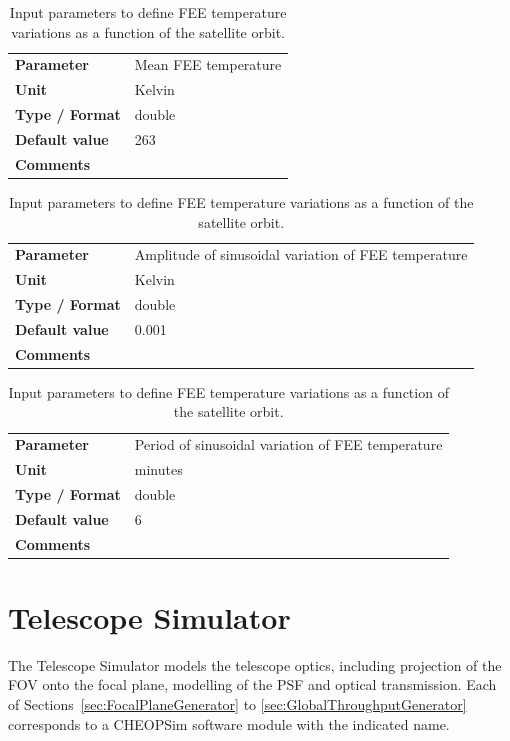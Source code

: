 \documentclass[11pt]{article}      %
\def\HCode#1{}
\def\htmlanchor#1{\HCode{<a id="#1"></a>}}
\begin{document}
\begin{table}[hb]
  \caption{Input parameters to define FEE temperature variations as a function of the satellite orbit.}

  \htmlanchor{feeMeanTemperature}
  \begin{tabular}{| l | p{13cm} |}
    \hline 
    {\bf Parameter} & Mean FEE temperature\\
    {\bf Unit} & Kelvin\\
    {\bf Type / Format} & double\\
    {\bf Default value} & 263\\
    {\bf Comments} & \\
    \hline
  \end{tabular}
  \bigskip

  \htmlanchor{feeTemperatureAmplitude}
  \begin{tabular}{| l | p{13cm} |}
    \hline 
    {\bf Parameter} & Amplitude of sinusoidal variation of FEE temperature\\
    {\bf Unit} & Kelvin\\
    {\bf Type / Format} & double\\
    {\bf Default value} & 0.001\\
    {\bf Comments} & \\
    \hline
  \end{tabular}
  \bigskip 

  \htmlanchor{feeTemperaturePeriod}
  \begin{tabular}{| l | p{13cm} |}
    \hline 
    {\bf Parameter} & Period of sinusoidal variation of FEE temperature\\
    {\bf Unit} & minutes\\
    {\bf Type / Format} & double\\
    {\bf Default value} & 6\\
    {\bf Comments} & \\
    \hline
  \end{tabular}
  \bigskip

  \label{tab:orbit4}
\end{table}

\clearpage
\section{Telescope Simulator}
\label{sec:Telescope}

The Telescope Simulator models the telescope optics, including projection of the FOV onto the focal plane, modelling of the PSF and
optical transmission. Each of Sections~\ref{sec:FocalPlaneGenerator} to \ref{sec:GlobalThroughputGenerator} corresponds to a CHEOPSim software module with the indicated name.
\end{document}
